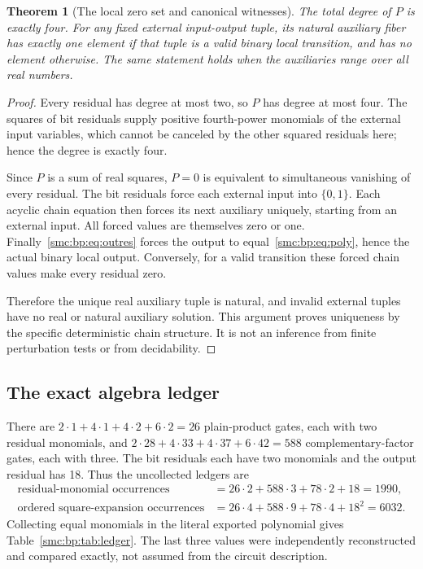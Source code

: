 \documentclass[11pt,letterpaper]{article}
\numberwithin{equation}{section}
\newtheorem{theorem}{Theorem}[section]
\theoremstyle{definition}
\theoremstyle{remark}
\begin{document}
\begin{theorem}[The local zero set and canonical witnesses]\label{smc:bp:thm:quartic}
The total degree of $P$ is exactly four. For any fixed external input-output tuple, its natural auxiliary fiber has exactly one element if that tuple is a valid binary local transition, and has no element otherwise. The same statement holds when the auxiliaries range over all real numbers.
\end{theorem}
\begin{proof}
Every residual has degree at most two, so $P$ has degree at most four. The squares of bit residuals supply positive fourth-power monomials of the external input variables, which cannot be canceled by the other squared residuals here; hence the degree is exactly four.

Since $P$ is a sum of real squares, $P=0$ is equivalent to simultaneous vanishing of every residual. The bit residuals force each external input into $\{0,1\}$. Each acyclic chain equation then forces its next auxiliary uniquely, starting from an external input. All forced values are themselves zero or one. Finally~\eqref{smc:bp:eq:outres} forces the output to equal~\eqref{smc:bp:eq:poly}, hence the actual binary local output. Conversely, for a valid transition these forced chain values make every residual zero.

Therefore the unique real auxiliary tuple is natural, and invalid external tuples have no real or natural auxiliary solution. This argument proves uniqueness by the specific deterministic chain structure. It is not an inference from finite perturbation tests or from decidability.
\end{proof}

\subsection{The exact algebra ledger}
There are $2\cdot1+4\cdot1+4\cdot2+6\cdot2=26$ plain-product gates, each with two residual monomials, and $2\cdot28+4\cdot33+4\cdot37+6\cdot42=588$ complementary-factor gates, each with three. The bit residuals each have two monomials and the output residual has 18. Thus the uncollected ledgers are
\begin{align*}
\text{residual-monomial occurrences}&=26\cdot2+588\cdot3+78\cdot2+18=1990,\\
\text{ordered square-expansion occurrences}&=26\cdot4+588\cdot9+78\cdot4+18^2=6032.
\end{align*}
Collecting equal monomials in the literal exported polynomial gives Table~\ref{smc:bp:tab:ledger}. The last three values were independently reconstructed and compared exactly, not assumed from the circuit description.
\end{document}
